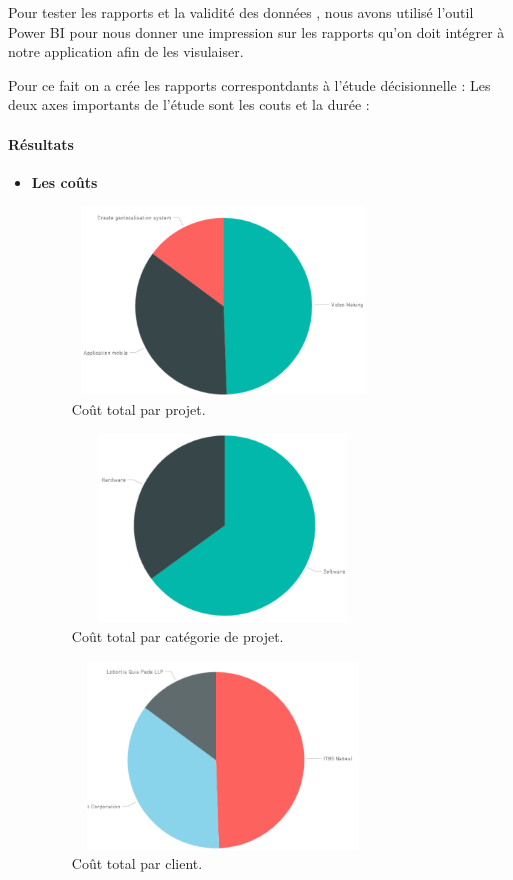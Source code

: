 Pour tester les rapports et la validit\'{e} des donn\'{e}es , nous avons utilis\'{e} l'outil
Power BI pour nous donner une impression sur les rapports qu'on doit
int\'{e}grer \`{a} notre application afin de les visulaiser.

\bigskip
Pour ce fait on a cr\'{e}e les rapports correspontdants \`{a} l'\'{e}tude d\'{e}cisionnelle :
Les deux axes importants de l'\'{e}tude sont les couts et la dur\'{e}e :


\newpage
\paragraph{R\'{e}sultats  }
\begin{itemize}

\item{ \textbf{Les  co\^{u}ts}  }

\begin{figure}[H]
\center
\includegraphics[width=8cm,height=5cm]{./figures/rpb1.png}
\caption{Co\^{u}t total par projet.}

\end{figure}

\begin{figure}[H]
\center
\includegraphics[width=8cm,height=5cm]{./figures/rpb2.png}
\caption{Co\^{u}t total par catégorie de projet.}

\end{figure}

\begin{figure}[H]
\center
\includegraphics[width=8cm,height=5cm]{./figures/rpb3.png}
\caption{Co\^{u}t total par client.}


\end{figure}
\end{itemize}

